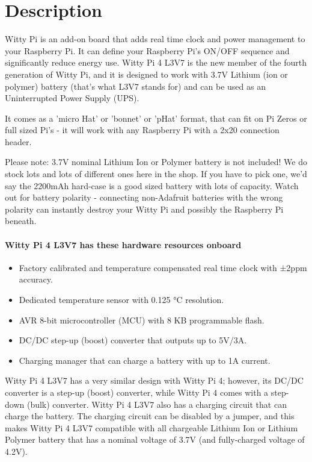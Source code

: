 \documentclass{article}\usepackage[]{graphicx}\usepackage[]{xcolor}
\begin{document}
\section{Description}
Witty Pi is an add-on board that adds real time clock and power management to your Raspberry Pi. It can define your Raspberry Pi’s ON/OFF sequence and significantly reduce energy use. Witty Pi 4 L3V7 is the new member of the fourth generation of Witty Pi, and it is designed to work with 3.7V Lithium (ion or polymer) battery (that’s what L3V7 stands for) and can be used as an Uninterrupted Power Supply (UPS).

It comes as a 'micro Hat' or 'bonnet' or 'pHat' format, that can fit on Pi Zeros or full sized Pi's - it will work with any Raspberry Pi with a 2x20 connection header.

Please note: 3.7V nominal Lithium Ion or Polymer battery is not included! We do stock lots and lots of different ones here in the shop. If you have to pick one, we'd say the 2200mAh hard-case is a good sized battery with lots of capacity.  Watch out for battery polarity - connecting non-Adafruit batteries with the wrong polarity can instantly destroy your Witty Pi and possibly the Raspberry Pi beneath.

\paragraph{Witty Pi 4 L3V7 has these hardware resources onboard}

\begin{itemize}

\item Factory calibrated and temperature compensated real time clock with ±2ppm accuracy.
\item Dedicated temperature sensor with 0.125 °C resolution.
\item AVR 8-bit microcontroller (MCU) with 8 KB programmable flash.
\item DC/DC step-up (boost) converter that outputs up to 5V/3A.
\item Charging manager that can charge a battery with up to 1A current.
\end{itemize}

Witty Pi 4 L3V7 has a very similar design with Witty Pi 4; however, its DC/DC converter is a step-up (boost) converter, while Witty Pi 4 comes with a step-down (bulk) converter. Witty Pi 4 L3V7 also has a charging circuit that can charge the battery. The charging circuit can be disabled by a jumper, and this makes Witty Pi 4 L3V7 compatible with all chargeable Lithium Ion or Lithium Polymer battery that has a nominal voltage of 3.7V (and fully-charged voltage of 4.2V).
\end{document}
